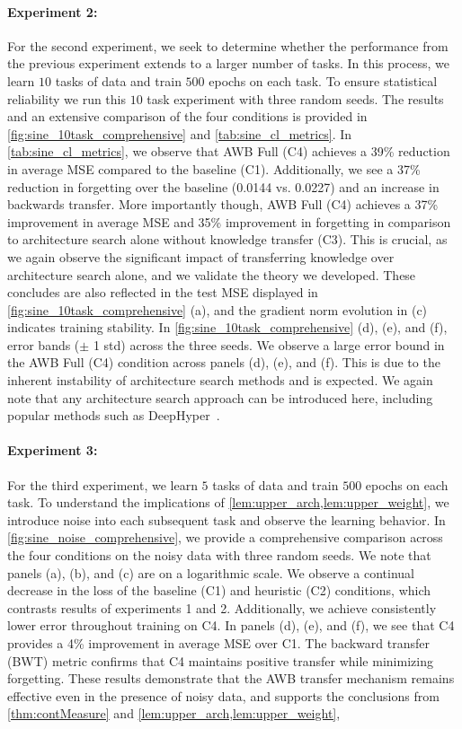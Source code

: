 \paragraph{Experiment 2:} For the second experiment, we seek to determine whether  the performance from the previous experiment extends to a larger number of tasks. In this process, we learn $10$ tasks of data and train $500$ epochs on each task. To ensure statistical reliability we run this $10$ task experiment with three random seeds. The results and an extensive comparison of the four conditions is provided in \cref{fig:sine_10task_comprehensive} and \cref{tab:sine_cl_metrics}. In \cref{tab:sine_cl_metrics}, we observe that AWB Full (C4) achieves a 39\% reduction in average MSE compared to the baseline (C1). Additionally, we see a 37\% reduction in forgetting over the baseline (0.0144 vs. 0.0227) and an increase in backwards transfer. More importantly though, AWB Full (C4) achieves a 37\% improvement in average MSE and 35\% improvement in forgetting in comparison to architecture search alone without knowledge transfer (C3). This is crucial, as we again observe the significant impact of transferring knowledge over architecture search alone, and we validate the theory we developed. These concludes are also reflected in the test MSE displayed in \cref{fig:sine_10task_comprehensive} (a), and the gradient norm evolution in (c) indicates training stability. In \cref{fig:sine_10task_comprehensive} (d), (e), and (f), error bands ($\pm$ 1 std) across the three seeds. We observe a large error bound in the AWB Full (C4) condition across panels (d), (e), and (f). This is due to the inherent instability of architecture search methods and is expected. We again note that  any architecture search approach can be introduced here, including popular  methods such as DeepHyper~\cite{Balaprakash2018DeepHyper}.





\paragraph{Experiment 3:} For the third experiment, we learn $5$ tasks of data and train $500$ epochs on each task. To  understand the implications of \cref{lem:upper_arch,lem:upper_weight}, we introduce noise into each subsequent task and observe the learning behavior. In \cref{fig:sine_noise_comprehensive}, we provide a comprehensive comparison across the four conditions on the noisy data with three random seeds. We note that panels (a), (b), and (c) are on a logarithmic scale.  We observe a continual decrease in the loss of the baseline (C1) and heuristic (C2) conditions, which contrasts results of experiments 1 and 2. Additionally, we achieve consistently lower error throughout training on C4. In panels (d), (e), and (f), we see that C4 provides a 4\% improvement in average MSE over C1. The backward transfer (BWT) metric confirms that C4 maintains positive transfer while minimizing forgetting. These results demonstrate that the AWB transfer mechanism remains effective even in the presence of noisy data, and supports the conclusions from \cref{thm:contMeasure} and \cref{lem:upper_arch,lem:upper_weight},


